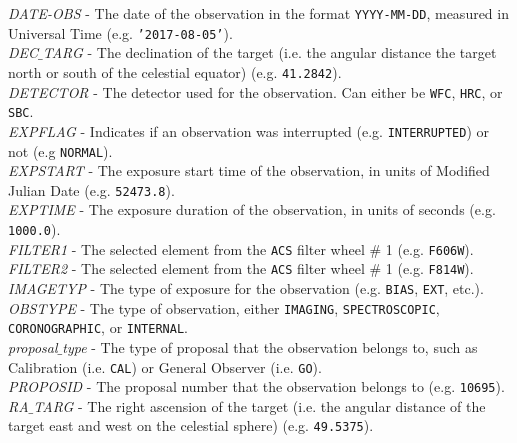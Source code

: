 \documentclass[10pt,journal,compsoc]{IEEEtran}
\begin{document}
\textit{DATE-OBS} - The date of the observation in the format \texttt{YYYY-MM-DD}, measured in
Universal Time (e.g. \texttt{'2017-08-05'}).\\

\textit{DEC$\_$TARG} - The declination of the target (i.e. the angular distance the target north or south
of the celestial equator) (e.g. \texttt{41.2842}).\\

\textit{DETECTOR} - The detector used for the observation.  Can either be \texttt{WFC}, \texttt{HRC},
or \texttt{SBC}.\\

\textit{EXPFLAG} - Indicates if an observation was interrupted (e.g. \texttt{INTERRUPTED}) or not
(e.g \texttt{NORMAL}).\\

\textit{EXPSTART} - The exposure start time of the observation, in units of Modified Julian Date
(e.g. \texttt{52473.8}).\\

\textit{EXPTIME} - The exposure duration of the observation, in units of seconds (e.g. \texttt{1000.0}).\\

\textit{FILTER1} - The selected element from the \texttt{ACS} filter wheel \# 1 (e.g. \texttt{F606W}).\\

\textit{FILTER2} - The selected element from the \texttt{ACS} filter wheel \# 1 (e.g. \texttt{F814W}).\\

\textit{IMAGETYP} - The type of exposure for the observation (e.g. \texttt{BIAS}, \texttt{EXT}, etc.).\\

\textit{OBSTYPE} - The type of observation, either \texttt{IMAGING}, \texttt{SPECTROSCOPIC},
\texttt{CORONOGRAPHIC}, or \texttt{INTERNAL}.\\

\textit{proposal$\_$type} - The type of proposal that the observation belongs to, such as Calibration
(i.e. \texttt{CAL}) or General Observer (i.e. \texttt{GO}).\\

\textit{PROPOSID} - The proposal number that the observation belongs to (e.g. \texttt{10695}).\\

\textit{RA$\_$TARG} - The right ascension of the target (i.e. the angular distance of the target east and west
on the celestial sphere) (e.g. \texttt{49.5375}).\\
\end{document}

